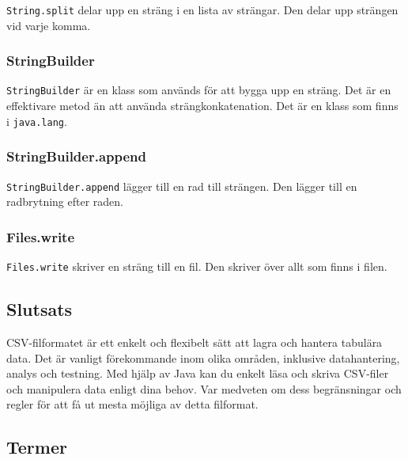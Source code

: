 \texttt{String.split} delar upp en sträng i en lista av strängar. Den
delar upp strängen vid varje komma.

\hypertarget{stringbuilder}{%
\subsubsection{StringBuilder}\label{stringbuilder}}

\texttt{StringBuilder} är en klass som används för att bygga upp en
sträng. Det är en effektivare metod än att använda strängkonkatenation.
Det är en klass som finns i \texttt{java.lang}.

\hypertarget{stringbuilder.append}{%
\subsubsection{StringBuilder.append}\label{stringbuilder.append}}

\texttt{StringBuilder.append} lägger till en rad till strängen. Den
lägger till en radbrytning efter raden.

\hypertarget{files.write}{%
\subsubsection{Files.write}\label{files.write}}

\texttt{Files.write} skriver en sträng till en fil. Den skriver över
allt som finns i filen.

\hypertarget{slutsats}{%
\subsection{Slutsats}\label{slutsats}}

CSV-filformatet är ett enkelt och flexibelt sätt att lagra och hantera
tabulära data. Det är vanligt förekommande inom olika områden, inklusive
datahantering, analys och testning. Med hjälp av Java kan du enkelt läsa
och skriva CSV-filer och manipulera data enligt dina behov. Var medveten
om dess begränsningar och regler för att få ut mesta möjliga av detta
filformat.

\hypertarget{termer}{%
\subsection{Termer}\label{termer}}

